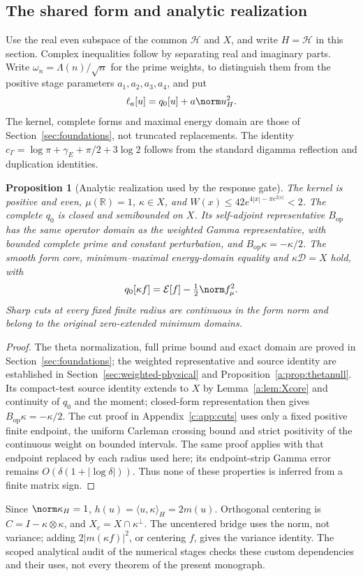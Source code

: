 \documentclass[11pt,a4paper]{article}
\numberwithin{equation}{section}
\newtheorem{proposition}[theorem]{Proposition}
\theoremstyle{definition}\newtheorem{definition}[theorem]{Definition}
\theoremstyle{remark}\newtheorem{remark}[theorem]{Remark}
\newcommand{\op}{\mathrm{op}}\newcommand{\lo}{\mathrm{lo}}\newcommand{\up}{\mathrm{up}}\newcommand{\eps}{\varepsilon}
\newcommand{\rhip}[2]{\langle#1,#2\rangle_H}
\newcommand{\R}{\mathbb R}\newcommand{\C}{\mathbb C}\newcommand{\N}{\mathbb N}
\newcommand{\E}{\mathcal E}\newcommand{\D}{\mathcal D}
\newcommand{\Hh}{\mathcal H}\newcommand{\Hw}{\mathcal H}
\begin{document}
\subsection{The shared form and analytic realization}\label{vrg:sec:objects}
Use the real even subspace of the common $\Hh$ and $X$, and write $H=\Hh$ in this section. Complex inequalities follow by separating real and imaginary parts. Write $\omega_n=\Lambda(n)/\sqrt n$ for the prime weights, to distinguish them from the positive stage parameters $a_1,a_2,a_3,a_4$, and put
\begin{equation}\label{vrg:eq:forms}
 \ell_a[u]=q_0[u]+a\norm u_H^2.
\end{equation}
The kernel, complete forms and maximal energy domain are those of Section~\ref{sec:foundations}, not truncated replacements. The identity $c_\Gamma=\log\pi+\gamma_E+\pi/2+3\log2$ follows from the standard digamma reflection and duplication identities.

\begin{proposition}[Analytic realization used by the response gate]\label{vrg:hyp:realization}
The kernel is positive and even, $\mu(\R)=1$, $\kappa\in X$, and $W(x)\le42e^{4|x|-\pi e^{2|x|}}<2$. The complete $q_0$ is closed and semibounded on $X$. Its self-adjoint representative $B_{\op}$ has the same operator domain as the weighted Gamma representative, with bounded complete prime and constant perturbation, and $B_{\op}\kappa=-\kappa/2$. The smooth form core, minimum--maximal energy-domain equality and $\kappa\D=X$ hold, with
\[
 q_0[\kappa f]=\E[f]-\tfrac12\norm f_\mu^2.
\]
Sharp cuts at every fixed finite radius are continuous in the form norm and belong to the original zero-extended minimum domains.
\end{proposition}
\begin{proof}
The theta normalization, full prime bound and exact domain are proved in Section~\ref{sec:foundations}; the weighted representative and source identity are established in Section~\ref{sec:weighted-physical} and Proposition~\ref{a:prop:thetanull}. Its compact-test source identity extends to $X$ by Lemma~\ref{a:lem:Xcore} and continuity of $q_0$ and the moment; closed-form representation then gives $B_{\op}\kappa=-\kappa/2$. The cut proof in Appendix~\ref{c:app:cuts} uses only a fixed positive finite endpoint, the uniform Carleman crossing bound and strict positivity of the continuous weight on bounded intervals. The same proof applies with that endpoint replaced by each radius used here; its endpoint-strip Gamma error remains $O(\delta(1+|\log\delta|))$. Thus none of these properties is inferred from a finite matrix sign.
\end{proof}
Since $\norm\kappa_H=1$, $h(u)=\rhip u\kappa=2m(u)$. Orthogonal centering is $C=I-\kappa\otimes\kappa$, and $X_c=X\cap\kappa^\perp$. The uncentered bridge uses the norm, not variance; adding $2|m(\kappa f)|^2$, or centering $f$, gives the variance identity. The scoped analytical audit of the numerical stages checks these custom dependencies and their uses, not every theorem of the present monograph.
\end{document}

